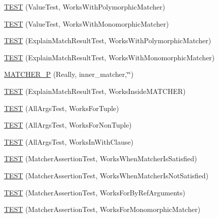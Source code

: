 \begin{DoxyCompactItemize}
\hyperlink{namespacetesting_1_1gmock__matchers__test_a150118d4e990ba9fb9978329e742c931}{T\+E\+ST} (Value\+Test, Works\+With\+Polymorphic\+Matcher)
\item 
\hyperlink{namespacetesting_1_1gmock__matchers__test_a53403682e9ffc12152b0b1c7f55dfa12}{T\+E\+ST} (Value\+Test, Works\+With\+Monomorphic\+Matcher)
\item 
\hyperlink{namespacetesting_1_1gmock__matchers__test_a985e2bc1546b67de764d759de111e8e9}{T\+E\+ST} (Explain\+Match\+Result\+Test, Works\+With\+Polymorphic\+Matcher)
\item 
\hyperlink{namespacetesting_1_1gmock__matchers__test_aeff2711a03b27a66c1c98ed97ff49b09}{T\+E\+ST} (Explain\+Match\+Result\+Test, Works\+With\+Monomorphic\+Matcher)
\item 
\hyperlink{namespacetesting_1_1gmock__matchers__test_ae59dd69f7bc69e592dc851fef825d0ba}{M\+A\+T\+C\+H\+E\+R\+\_\+P} (Really, inner\+\_\+matcher,\char`\"{}\char`\"{})
\item 
\hyperlink{namespacetesting_1_1gmock__matchers__test_ae57edef8890da6b929dd0d21c2f7c071}{T\+E\+ST} (Explain\+Match\+Result\+Test, Works\+Inside\+M\+A\+T\+C\+H\+ER)
\item 
\hyperlink{namespacetesting_1_1gmock__matchers__test_aeea300647af4c7611f4e491cabcbf950}{T\+E\+ST} (All\+Args\+Test, Works\+For\+Tuple)
\item 
\hyperlink{namespacetesting_1_1gmock__matchers__test_aacc3ed6d6a0f9ff552019d0d58817b6f}{T\+E\+ST} (All\+Args\+Test, Works\+For\+Non\+Tuple)
\item 
\hyperlink{namespacetesting_1_1gmock__matchers__test_ad62534535946b2ef45457fb653f73a98}{T\+E\+ST} (All\+Args\+Test, Works\+In\+With\+Clause)
\item 
\hyperlink{namespacetesting_1_1gmock__matchers__test_ad37559f9112c04334a62ce9617cf1349}{T\+E\+ST} (Matcher\+Assertion\+Test, Works\+When\+Matcher\+Is\+Satisfied)
\item 
\hyperlink{namespacetesting_1_1gmock__matchers__test_a2f3755be7052d6e7769e3323053399d0}{T\+E\+ST} (Matcher\+Assertion\+Test, Works\+When\+Matcher\+Is\+Not\+Satisfied)
\item 
\hyperlink{namespacetesting_1_1gmock__matchers__test_afcf1287c7fd759157367026613ddd727}{T\+E\+ST} (Matcher\+Assertion\+Test, Works\+For\+By\+Ref\+Arguments)
\item 
\hyperlink{namespacetesting_1_1gmock__matchers__test_a0fe4bde05f667c4877e3b4a4a7bde002}{T\+E\+ST} (Matcher\+Assertion\+Test, Works\+For\+Monomorphic\+Matcher)
\item 

\end{DoxyCompactItemize}

